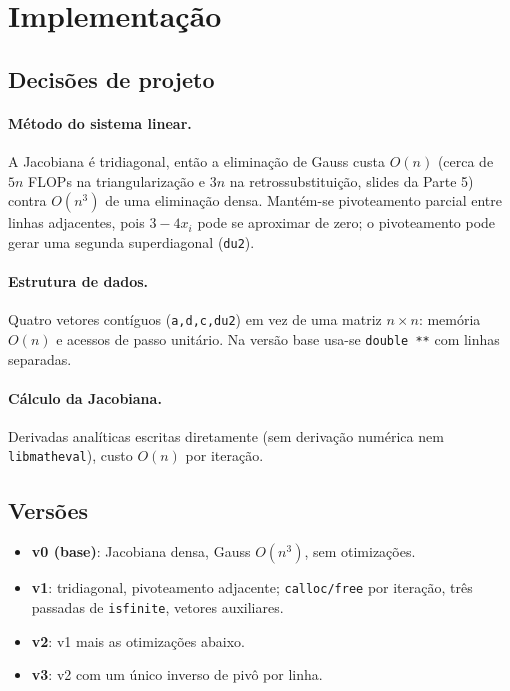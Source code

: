 \documentclass[10pt,a4paper]{article}
\begin{document}
\section{Implementação}
\subsection{Decisões de projeto}
\paragraph{Método do sistema linear.} A Jacobiana é tridiagonal, então a eliminação de Gauss
custa $O(n)$ (cerca de $5n$ FLOPs na triangularização e $3n$ na retrossubstituição, slides da Parte 5)
contra $O(n^3)$ de uma eliminação densa. Mantém-se pivoteamento parcial entre linhas adjacentes, pois $3-4x_i$
pode se aproximar de zero; o pivoteamento pode gerar uma segunda superdiagonal (\texttt{du2}).
\paragraph{Estrutura de dados.} Quatro vetores contíguos (\texttt{a,d,c,du2}) em vez de uma matriz $n\times n$:
memória $O(n)$ e acessos de passo unitário. Na versão base usa-se \texttt{double **} com linhas separadas.
\paragraph{Cálculo da Jacobiana.} Derivadas analíticas escritas diretamente (sem derivação numérica nem
\texttt{libmatheval}), custo $O(n)$ por iteração.

\subsection{Versões}
\begin{itemize}
\item \textbf{v0 (base)}: Jacobiana densa, Gauss $O(n^3)$, sem otimizações.
\item \textbf{v1}: tridiagonal, pivoteamento adjacente; \texttt{calloc/free} por iteração, três passadas de \texttt{isfinite}, vetores auxiliares.
\item \textbf{v2}: v1 mais as otimizações abaixo.
\item \textbf{v3}: v2 com um único inverso de pivô por linha.
\end{itemize}
\end{document}
